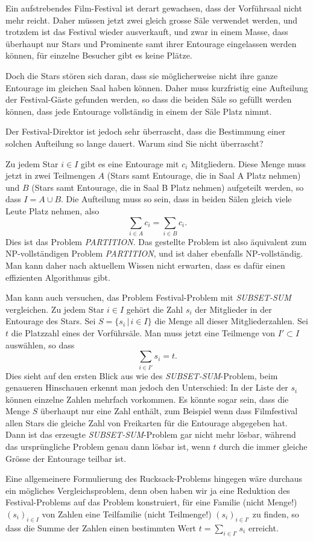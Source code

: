 Ein aufstrebendes Film-Festival ist derart gewachsen, dass der 
Vorführsaal nicht mehr reicht. Daher müssen jetzt zwei gleich
grosse Säle verwendet werden, und trotzdem ist das Festival
wieder ausverkauft, und zwar in einem Masse, dass überhaupt nur Stars und Prominente
samt ihrer Entourage eingelassen werden können, für
einzelne Besucher gibt es keine Plätze.

Doch die Stars stören sich daran, dass sie möglicherweise nicht
ihre ganze Entourage im gleichen Saal haben können. Daher muss
kurzfristig eine Aufteilung der Festival-Gäste gefunden werden,
so dass die beiden Säle so gefüllt werden können, dass
jede Entourage vollständig in einem der Säle Platz nimmt.

Der Festival-Direktor ist jedoch sehr überrascht, dass die
Bestimmung einer solchen Aufteilung so lange dauert. Warum
sind Sie nicht überrascht?

\begin{loesung}
Zu jedem Star $i\in I$ gibt es eine Entourage mit $c_i$
Mitgliedern. Diese Menge muss jetzt in zwei Teilmengen
$A$ (Stars samt Entourage, die in Saal A Platz nehmen) und
$B$ (Stars samt Entourage, die in Saal B Platz nehmen) aufgeteilt
werden, so dass $I=A\cup B$. Die Aufteilung muss so sein, dass
in beiden Sälen gleich viele Leute Platz nehmen, also
\[
\sum_{i\in A}c_i=
\sum_{i\in B}c_i.
\]
Dies ist das Problem {\it PARTITION}. Das gestellte Problem ist also
äquivalent zum NP-vollständigen Problem {\it PARTITION}, und ist
daher ebenfalls NP-vollständig. Man kann daher nach aktuellem
Wissen nicht erwarten, dass es dafür einen effizienten Algorithmus
gibt.
\end{loesung}

\begin{diskussion}
Man kann auch versuchen, das Problem Festival-Problem mit
{\it SUBSET-SUM} vergleichen.
Zu jedem Star $i\in I$ gehört die Zahl $s_i$ der Mitglieder in der
Entourage des Stars. Sei $S=\{s_i\,|\,i\in I\}$ die Menge all dieser
Mitgliederzahlen. Sei $t$ die Platzzahl eines der Vorführsäle.
Man muss jetzt eine Teilmenge von $I'\subset I$ auswählen, so dass
\[
\sum_{i\in I'} s_i=t.
\]
Dies sieht auf den ersten Blick aus wie des {\it SUBSET-SUM}-Problem,
beim genaueren Hinschauen erkennt man jedoch den Unterschied: In der
Liste der $s_i$ können einzelne Zahlen mehrfach vorkommen. Es könnte
sogar sein, dass die Menge $S$ überhaupt nur eine Zahl enthält,
zum Beispiel wenn dass Filmfestival allen Stars die gleiche Zahl von
Freikarten für die Entourage abgegeben hat. Dann ist das erzeugte
{\it SUBSET-SUM}-Problem gar nicht mehr lösbar, während das ursprüngliche
Problem genau dann lösbar ist, wenn $t$ durch die immer gleiche Grösse
der Entourage teilbar ist. 

Eine allgemeinere Formulierung des Rucksack-Problems hingegen wäre
durchaus ein mögliches Vergleichsproblem, denn oben haben wir ja
eine Reduktion des Festival-Problems auf das Problem konstruiert,
für eine Familie (nicht Menge!) $(s_i)_{i\in I}$ von Zahlen eine
Teilfamilie (nicht Teilmenge!) $(s_i)_{i\in I'}$ zu finden, so dass
die Summe der Zahlen einen bestimmten Wert $t=\sum_{i\in I'}s_i$
erreicht.
\end{diskussion}


